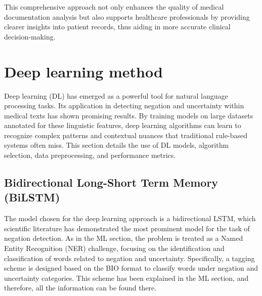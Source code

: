 \documentclass{article}
\begin{document}
This comprehensive approach not only enhances the quality of medical documentation analysis but also supports
healthcare professionals by providing clearer insights into patient records, thus aiding in more accurate
clinical decision-making.

\section*{Deep learning method}
Deep learning (DL) has emerged as a powerful tool for natural language processing tasks. Its application in
detecting negation and uncertainty within medical texts has shown promising results. By training models on
large datasets annotated for these linguistic features, deep learning algorithms can learn to recognize complex
patterns and contextual nuances that traditional rule-based systems often miss. 
This section details the use of DL models, algorithm selection, data preprocessing, and performance metrics.

\subsection*{Bidirectional Long-Short Term Memory (BiLSTM)}
The model chosen for the deep learning approach is a bidirectional LSTM, which scientific literature has
demonstrated the most prominent model for the task of negation detection. As in the ML section, the problem
is treated as a Named Entity Recognition (NER) challenge, focusing on the identification and classification
of words related to negation and uncertainty. Specifically, a tagging scheme is designed based on the BIO format
to classify words under negation and uncertainty categories. This scheme has been explained in the ML section,
and therefore, all the information can be found there.
\end{document}
